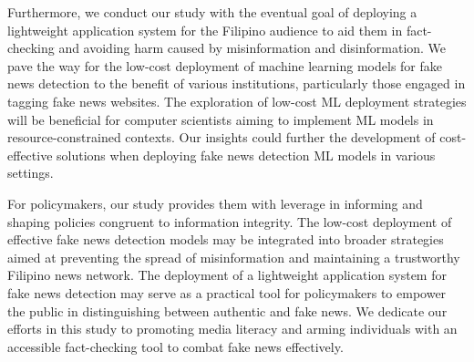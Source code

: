Furthermore, we conduct our study with the eventual goal of deploying a lightweight application system for the Filipino audience to aid them in fact-checking and avoiding harm caused by misinformation and disinformation. We pave the way for the low-cost deployment of machine learning models for fake news detection to the benefit of various institutions, particularly those engaged in tagging fake news websites. The exploration of low-cost ML deployment strategies will be beneficial for computer scientists aiming to implement ML models in resource-constrained contexts. Our insights could further the development of cost-effective solutions when deploying fake news detection ML models in various settings.

For policymakers, our study provides them with leverage in informing and shaping policies congruent to information integrity. The low-cost deployment of effective fake news detection models may be integrated into broader strategies aimed at preventing the spread of misinformation and maintaining a trustworthy Filipino news network. The deployment of a lightweight application system for fake news detection may serve as a practical tool for policymakers to empower the public in distinguishing between authentic and fake news. We dedicate our efforts in this study to promoting media literacy and arming individuals with an accessible fact-checking tool to combat fake news effectively.